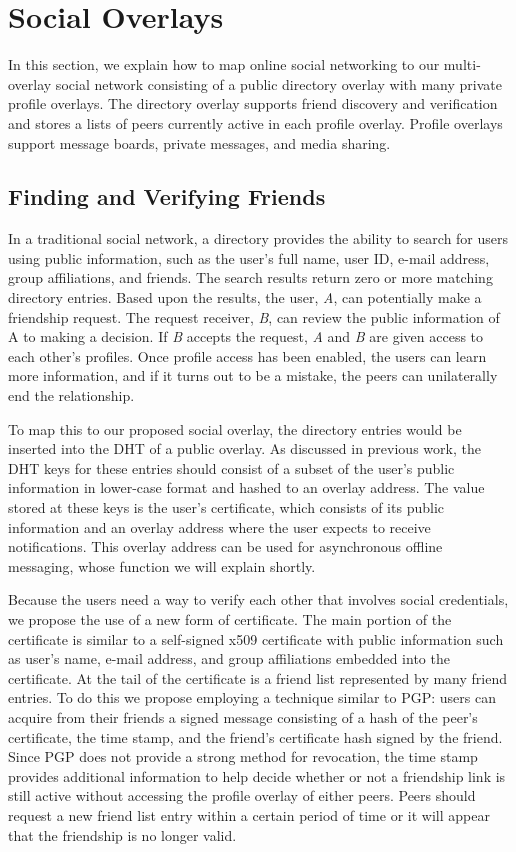 \documentclass[letterpaper,twocolumn,10pt]{article}
\begin{document}
\section{Social Overlays}
\label{social_overlays}
In this section, we explain how to map online social networking to our
multi-overlay social network consisting of a public directory overlay with many
private profile overlays.  The directory overlay supports friend discovery and
verification and stores a lists of peers currently active in each profile
overlay.  Profile overlays support message boards, private messages, and media
sharing.

\subsection{Finding and Verifying Friends}
In a traditional social network, a directory provides the ability to search
for users using public information, such as the user's full name, user ID,
e-mail address, group affiliations, and friends.  The search results return zero
or more matching directory entries.  Based upon the results, the user,
\textit{A}, can potentially make a friendship request.  The request receiver,
\textit{B}, can review the public information of A to making a decision.  If
\textit{B} accepts the request, \textit{A} and \textit{B} are given access to
each other's profiles.  Once profile access has been enabled, the users can
learn more information, and if it turns out to be a mistake, the peers can
unilaterally end the relationship.

To map this to our proposed social overlay, the directory entries would be
inserted into the DHT of a public overlay.  As discussed in previous work, the
DHT keys for these entries should consist of a subset of the user's
public information in lower-case format and hashed to an overlay  address.  The
value stored at these keys is the user's certificate, which consists of its public
information and an overlay address where the user expects to receive
notifications.  This overlay address can be used for asynchronous offline
messaging, whose function we will explain shortly.

Because the users need a way to verify each other that involves social credentials,
we propose the use of a new form of certificate.
The main portion of the certificate is similar to a self-signed
x509 certificate with public information such as user's name, e-mail
address, and group affiliations embedded into the certificate.  At the tail of
the certificate is a friend list represented by many friend entries.  To do this
we propose employing a technique similar to PGP: users can acquire from their
friends a signed message consisting of a hash of the peer's certificate, the
time stamp, and the friend's certificate hash signed by the friend.  Since PGP
does not provide a strong method for revocation, the time stamp provides
additional information to help decide whether or not a friendship link is still
active without accessing the profile overlay of either peers.  Peers should
request a new friend list entry within a certain period of time or it will
appear that the friendship is no longer valid.
\end{document}
